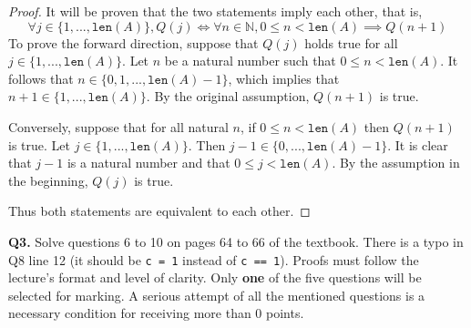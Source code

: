 \documentclass[11pt]{article}
\begin{document}
    \begin{proof}
        It will be proven that the two statements imply each other, that is,
        \[
            \forall j \in \{1,..., \texttt{len}(A)\}, Q(j) \iff \forall n \in \mathbb{N}, 0 \leq n < \texttt{len}(A) \implies Q(n+1)
        \]
        To prove the forward direction, suppose that \(Q(j)\) holds true for all \(j \in \{1,..., \texttt{len}(A)\}\). Let \(n\) be a natural number such that \(0 \leq n < \texttt{len}(A)\). It follows that \(n \in \{0, 1,..., \texttt{len}(A) -1\}\), which implies that \(n+1 \in \{1,..., \texttt{len}(A)\}\). By the original assumption, \(Q(n+1)\) is true.

        Conversely, suppose that for all natural \(n\), if \(0 \leq n <\texttt{len}(A)\) then \(Q(n+1)\) is true. Let \(j \in \{1,..., \texttt{len}(A)\}\). Then \(j-1 \in \{0,...,\texttt{len}(A)-1\}\).  It is clear that \(j-1\) is a natural number and that \(0\leq j <\texttt{len}(A)\). By the assumption in the beginning, \(Q(j)\) is true.

        Thus both statements are equivalent to each other.

    \end{proof}
    \pagebreak
    \textbf{Q3.} Solve questions 6 to 10 on pages 64 to 66 of the textbook. There is a typo in Q8 line 12 (it should be \verb|c = 1| instead of \verb|c == 1|). Proofs must follow the lecture's format and level of clarity. Only \textbf{one} of the five questions will be selected for marking. A serious attempt of all the mentioned questions is a necessary condition for receiving more than 0 points.
\end{document}

